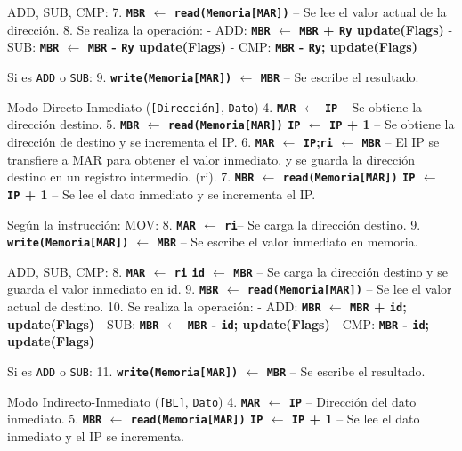 \documentclass[12pt,oneside]{templates/unerthesis}
\begin{document}
ADD, SUB, CMP:
7. \textbf{\texttt{MBR} \(\leftarrow\) \texttt{read(Memoria{[}MAR{]})}} -- Se lee el valor actual de la dirección.
8. Se realiza la operación:
- ADD: \textbf{\texttt{MBR} \(\leftarrow\) \texttt{MBR} + \texttt{Ry} \textbar{} update(Flags)}
- SUB: \textbf{\texttt{MBR} \(\leftarrow\) \texttt{MBR} - \texttt{Ry} \textbar{} update(Flags)}
- CMP: \textbf{\texttt{MBR} - \texttt{Ry}; update(Flags)}

Si es \texttt{ADD} o \texttt{SUB}:
9. \textbf{\texttt{write(Memoria{[}MAR{]})} \(\leftarrow\) \texttt{MBR}} -- Se escribe el resultado.

Modo Directo-Inmediato (\texttt{{[}Dirección{]}}, \texttt{Dato})
4. \textbf{\texttt{MAR} \(\leftarrow\) \texttt{IP}} -- Se obtiene la dirección destino.
5. \textbf{\texttt{MBR} \(\leftarrow\) \texttt{read(Memoria{[}MAR{]})} \textbar{} \texttt{IP} \(\leftarrow\) \texttt{IP} + 1} -- Se obtiene la dirección de destino y se incrementa el IP.
6. \textbf{\texttt{MAR} \(\leftarrow\) \texttt{IP};\texttt{ri} \(\leftarrow\) \texttt{MBR}} -- El IP se transfiere a MAR para obtener el valor inmediato. y se guarda la dirección destino en un registro intermedio. (ri).
7. \textbf{\texttt{MBR} \(\leftarrow\) \texttt{read(Memoria{[}MAR{]})} \textbar{} \texttt{IP} \(\leftarrow\) \texttt{IP} + 1} -- Se lee el dato inmediato y se incrementa el IP.

Según la instrucción:
MOV:
8. \textbf{\texttt{MAR} \(\leftarrow\) \texttt{ri}}-- Se carga la dirección destino.
9. \textbf{\texttt{write(Memoria{[}MAR{]})} \(\leftarrow\) \texttt{MBR}} -- Se escribe el valor inmediato en memoria.

ADD, SUB, CMP:
8. \textbf{\texttt{MAR} \(\leftarrow\) \texttt{ri} \textbar{} \texttt{id} \(\leftarrow\) \texttt{MBR}} -- Se carga la dirección destino y se guarda el valor inmediato en id.
9. \textbf{\texttt{MBR} \(\leftarrow\) \texttt{read(Memoria{[}MAR{]})}} -- Se lee el valor actual de destino.
10. Se realiza la operación:
- ADD: \textbf{\texttt{MBR} \(\leftarrow\) \texttt{MBR} + \texttt{id}; update(Flags)}
- SUB: \textbf{\texttt{MBR} \(\leftarrow\) \texttt{MBR} - \texttt{id}; update(Flags)}
- CMP: \textbf{\texttt{MBR} - \texttt{id}; update(Flags)}

Si es \texttt{ADD} o \texttt{SUB}:
11. \textbf{\texttt{write(Memoria{[}MAR{]})} \(\leftarrow\) \texttt{MBR}} -- Se escribe el resultado.

Modo Indirecto-Inmediato (\texttt{{[}BL{]}}, \texttt{Dato})
4. \textbf{\texttt{MAR} \(\leftarrow\) \texttt{IP}} -- Dirección del dato inmediato.
5. \textbf{\texttt{MBR} \(\leftarrow\) \texttt{read(Memoria{[}MAR{]})} \textbar{} \texttt{IP} \(\leftarrow\) \texttt{IP} + 1} -- Se lee el dato inmediato y el IP se incrementa.
\end{document}
